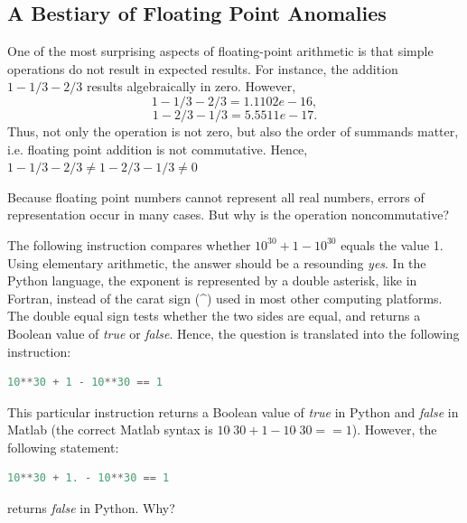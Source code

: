 
	
\subsection{A Bestiary of Floating Point Anomalies}\label{sec:FloatingPoint}

One of the most surprising aspects of floating-point arithmetic is that simple operations do not result in expected results. For instance, the addition $1-1/3-2/3$ results algebraically in zero. However,  
{\ttfamily\[
	1-1/3-2/3 = 1.1102e-16, 
\]}	{\ttfamily\[		
	1-2/3-1/3 = 5.5511e-17.		
\]}
Thus, not only the operation is not zero, but also the order of summands matter, i.e. floating point addition is not commutative. Hence,  $1-1/3-2/3 \neq 1-2/3-1/3 \neq 0$

Because floating point numbers cannot represent all real numbers, errors of representation occur in many cases. But why is the operation noncommutative?  \QA %

The following instruction compares whether $10^{30} + 1 - 10^{30}$ equals the value 1. Using elementary arithmetic, the answer should be a resounding \textit{yes}. In the Python language, the exponent is represented by a double asterisk, like in Fortran, instead of the carat sign (\^{}) used in most other computing platforms. The double equal sign tests whether the two sides are equal, and returns a Boolean value of \textit{true} or \textit{false}. Hence, the question is translated into the following instruction: 

\begin{lstlisting}[language=Python]
	10**30 + 1 - 10**30 == 1   
\end{lstlisting}

This particular instruction  returns a Boolean value of \textit{true} in Python and \textit{false} in Matlab (the correct Matlab syntax is $10\hat{\phantom{.}}30 + 1 - 10\hat{\phantom{.}}30 == 1$). However, the following statement:  

\begin{lstlisting}[language=Python]
	10**30 + 1. - 10**30 == 1
\end{lstlisting}

\noindent returns \textit{false} in Python. Why? \QA 

